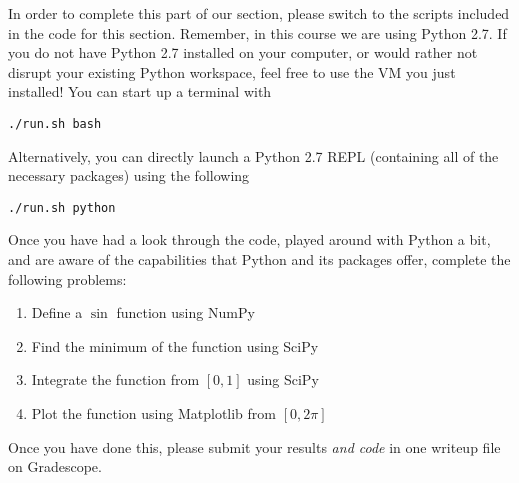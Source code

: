 \documentclass{article}
\begin{document}
In order to complete this part of our section, please switch to the scripts included in the code for this section. Remember, in this course we are using Python 2.7. If you do not have Python 2.7 installed on your computer, or would rather not disrupt your existing Python workspace, feel free to use the VM you just installed! You can start up a terminal with

 \begin{lstlisting}
./run.sh bash
\end{lstlisting}

Alternatively, you can directly launch a Python 2.7 REPL (containing all of the necessary packages) using the following

 \begin{lstlisting}
./run.sh python
\end{lstlisting}

Once you have had a look through the code, played around with Python a bit, and are aware of the capabilities that Python and its packages offer, complete the following problems:
{\bf
\begin{enumerate}
\item Define a $\sin$ function using NumPy
\item Find the minimum of the function using SciPy
\item Integrate the function from $[0, 1]$ using SciPy
\item Plot the function using Matplotlib from $[0, 2\pi]$
\end{enumerate}
}
Once you have done this, please submit your results \textit{and code} in one writeup file on Gradescope.
\end{document}
